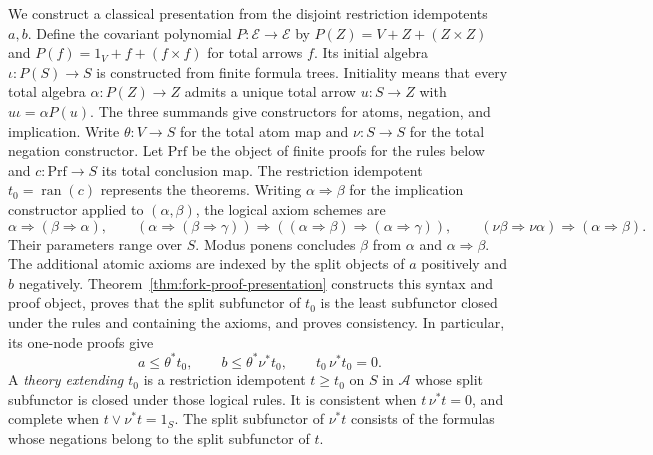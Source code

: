 \documentclass[11pt]{article}
\newcommand{\ran}{\operatorname{ran}}
\begin{document}
We construct a classical presentation from the disjoint restriction idempotents $a,b$.
Define the covariant polynomial
$P:\mathcal E\to\mathcal E$ by
$P(Z)=V+Z+(Z\times Z)$ and
$P(f)=1_V+f+(f\times f)$ for total arrows $f$.
Its initial algebra $\iota:P(S)\to S$ is constructed from finite
formula trees. Initiality means that every total algebra
$\alpha:P(Z)\to Z$ admits a unique total arrow $u:S\to Z$
with $u\iota=\alpha P(u)$.
The three summands give constructors for atoms, negation, and implication.
Write $\theta:V\to S$ for the total atom map
and $\nu:S\to S$ for the total negation constructor.
Let $\mathrm{Prf}$ be the object of finite proofs for the rules below
and $c:\mathrm{Prf}\to S$ its total conclusion map.
The restriction idempotent $t_0=\ran(c)$ represents the theorems.
Writing $\alpha\Rightarrow\beta$ for the implication constructor
applied to $(\alpha,\beta)$, the logical axiom schemes are
\[
 \alpha\Rightarrow(\beta\Rightarrow\alpha),\qquad
 (\alpha\Rightarrow(\beta\Rightarrow\gamma))
   \Rightarrow((\alpha\Rightarrow\beta)\Rightarrow
                         (\alpha\Rightarrow\gamma)),\qquad
 (\nu\beta\Rightarrow\nu\alpha)\Rightarrow(\alpha\Rightarrow\beta).
\]
Their parameters range over $S$. Modus ponens concludes $\beta$
from $\alpha$ and $\alpha\Rightarrow\beta$.
The additional atomic axioms are indexed by the split objects
of $a$ positively and $b$ negatively.
Theorem~\ref{thm:fork-proof-presentation} constructs this syntax and
proof object, proves that the split subfunctor of $t_0$ is the least
subfunctor closed under the rules and containing the axioms, and proves
consistency. In particular, its one-node proofs give
\begin{equation}\label{eq:atomic-inequalities}
 a\le\theta^*t_0,\qquad
 b\le\theta^*\nu^*t_0,\qquad t_0\,\nu^*t_0=0.
\end{equation}
A \emph{theory extending $t_0$} is a restriction idempotent $t\ge t_0$
on $S$ in $\mathcal A$ whose split subfunctor is closed under those
logical rules.
It is consistent when $t\,\nu^*t=0$, and complete when
$t\vee\nu^*t=1_S$. The split subfunctor of $\nu^*t$ consists of the formulas whose
negations belong to the split subfunctor of $t$.
\end{document}
